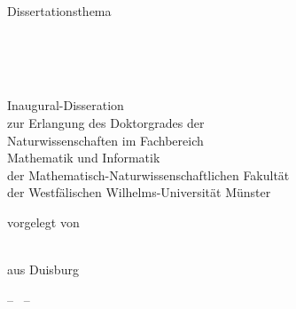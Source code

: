 
\begin{titlepage}

\begin{addmargin}[-1cm]{-3cm}
\begin{center}
\large

\hfill
\vfill

{\LARGE {}}

\vfill

Dissertationsthema

\vfill

\begingroup
  \huge \color{\titleColor}
  \begin{spacing}{1.25}
    \\
    \\
     \\
  \end{spacing}
\endgroup

\vfill

\begin{center}
  \begin{minipage}[t]{.85\textwidth}
    \centering
    \begin{spacing}{1.2}
    Inaugural-Disseration\\ zur Erlangung des Doktorgrades der\\
    Naturwissenschaften im Fachbereich\\ Mathematik und Informatik\\ der
    Mathematisch-Naturwissenschaftlichen Fakultät\\ der Westfälischen
    Wilhelms-Universität Münster
    \end{spacing}
  \end{minipage}
\end{center}

\vfill

vorgelegt von

\bigskip \bigskip

\spacedlowsmallcaps{\myName} \\ \medskip
aus Duisburg

\bigskip \bigskip

-- \myTime\ --

\vfill

\end{center}
\end{addmargin}

\end{titlepage}
